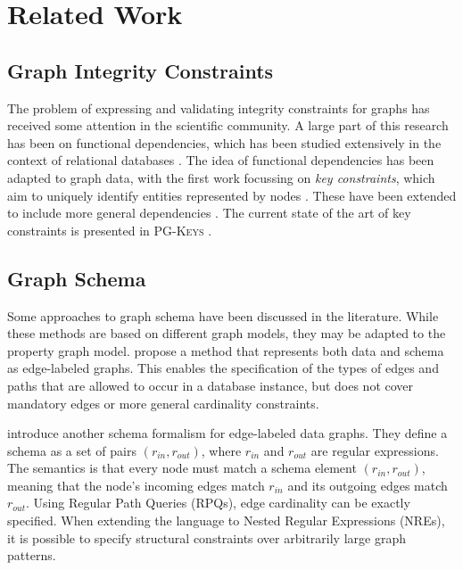 \documentclass{report}
\theoremstyle{definition}
\begin{document}
\chapter{Related Work}
\label{ch:related-work}

\section{Graph Integrity Constraints}


The problem of expressing and validating integrity constraints for graphs has received some attention in the scientific community. A large part of this research has been on functional dependencies, which has been studied extensively in the context of relational databases \citep{fagin1984theory,abiteboul1999data}. The idea of functional dependencies has been adapted to graph data, with the first work focussing on \emph{key constraints}, which aim to uniquely identify entities represented by nodes \citep{fan2015keys}. These have been extended to include more general dependencies \citep{fan2016functional}. The current state of the art of key constraints is presented in \textsc{PG-Keys} \citep{angles2021keys}.


\section{Graph Schema}

Some approaches to graph schema have been discussed in the literature. While these methods are based on different graph models, they may be adapted to the property graph model. \citet{buneman1997adding} propose a method that represents both data and schema as edge-labeled graphs. This enables the specification of the types of edges and paths that are allowed to occur in a database instance, but does not cover mandatory edges or more general cardinality constraints.

\citet{colazzo2015typing} introduce another schema formalism for edge-labeled data graphs. They define a schema as a set of pairs $(r_{in}, r_{out})$, where $r_{in}$ and $r_{out}$ are regular expressions. The semantics is that every node must match a schema element $(r_{in}, r_{out})$, meaning that the node's incoming edges match $r_{in}$ and its outgoing edges match $r_{out}$. Using Regular Path Queries (RPQs), edge cardinality can be exactly specified. When extending the language to Nested Regular Expressions (NREs), it is possible to specify structural constraints over arbitrarily large graph patterns.
\end{document}
